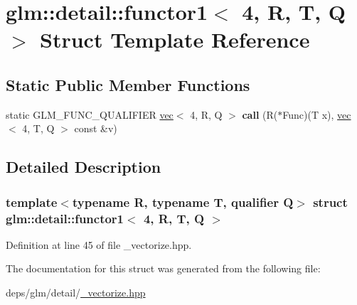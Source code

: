 \hypertarget{structglm_1_1detail_1_1functor1_3_014_00_01R_00_01T_00_01Q_01_4}{}\section{glm\+:\+:detail\+:\+:functor1$<$ 4, R, T, Q $>$ Struct Template Reference}
\label{structglm_1_1detail_1_1functor1_3_014_00_01R_00_01T_00_01Q_01_4}
\subsection*{Static Public Member Functions}
\begin{DoxyCompactItemize}
\item 
\mbox{\label{structglm_1_1detail_1_1functor1_3_014_00_01R_00_01T_00_01Q_01_4_a2cedf8c93f72d6dd2f94d7e81eb2ce69}} 
static G\+L\+M\+\_\+\+F\+U\+N\+C\+\_\+\+Q\+U\+A\+L\+I\+F\+I\+ER \hyperlink{structglm_1_1vec}{vec}$<$ 4, R, Q $>$ {\bfseries call} (R($\ast$Func)(T x), \hyperlink{structglm_1_1vec}{vec}$<$ 4, T, Q $>$ const \&v)
\end{DoxyCompactItemize}


\subsection{Detailed Description}
\subsubsection*{template$<$typename R, typename T, qualifier Q$>$\newline
struct glm\+::detail\+::functor1$<$ 4, R, T, Q $>$}



Definition at line 45 of file \+\_\+vectorize.\+hpp.



The documentation for this struct was generated from the following file\+:\begin{DoxyCompactItemize}
\item 
deps/glm/detail/\hyperlink{__vectorize_8hpp}{\+\_\+vectorize.\+hpp}\end{DoxyCompactItemize}
